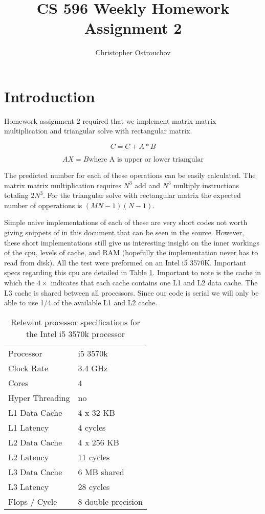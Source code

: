 \documentclass[a4paper,12pt]{article}
\begin{document}
\title{CS 596 Weekly Homework Assignment 2}
\author{Christopher Ostrouchov}
\date{}

\maketitle

\section{Introduction}
Homework assignment 2 required that we implement matrix-matrix multiplication and triangular solve with rectangular matrix. 

\[C = C + A * B \] 

\[AX = B \text{where A is upper or lower triangular}\]


The predicted number for each of these operations can be easily calculated. The matrix matrix multiplication requires $N^{3}$ add and $N^{3}$ multiply instructions totaling $2N^{3}$. For the triangular solve with rectangular matrix the expected number of opperations is $(MN - 1)(N - 1)$.

Simple naive implementations of each of these are very short codes not worth giving snippets of in this document that can be seen in the source. However, these short implementations still give us interesting insight on the inner workings of the cpu, levels of cache, and RAM (hopefully the implementation never has to read from disk). All the test were preformed on an Intel i5 3570K. Important specs regarding this cpu are detailed in Table \ref{tab:i5_3570k}. Important to note is the cache in which the $4 \times$ indicates that each cache contains one L1 and L2 data cache. The L3 cache is shared between all processors. Since our code is serial we will only be able to use 1/4 of the available L1 and L2 cache. 

\begin{table}[!ht]
  \centering
  \caption{Relevant processor specifications for the Intel i5 3570k processor}
  \label{tab:i5_3570k}

  \vspace{3mm}
  \begin{tabular}{ l | l } 
    Processor & i5 3570k \\
    Clock Rate & 3.4 GHz \\
    Cores & 4 \\
    Hyper Threading & no \\
    L1 Data Cache & 4 x 32 KB \\
    L1 Latency & 4 cycles \\
    L2 Data Cache & 4 x 256 KB \\
    L2 Latency & 11 cycles \\
    L3 Data Cache & 6 MB shared \\
    L3 Latency & 28 cycles \\
    Flops / Cycle & 8 double precision
  \end{tabular}
\end{table}
\end{document}
